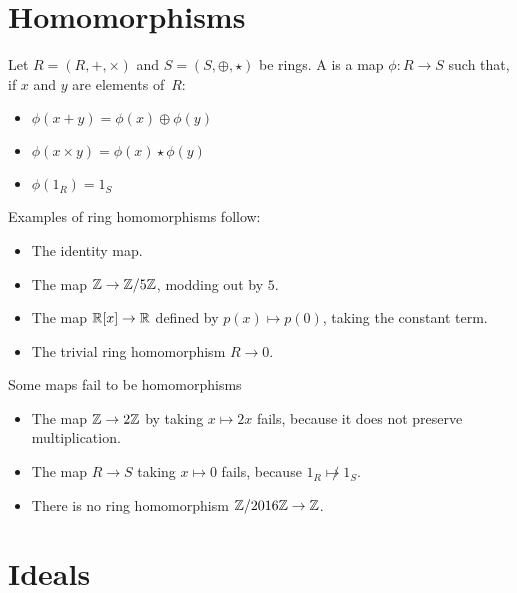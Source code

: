 \documentclass[11pt]{scrreport}
\begin{document}
\section{Homomorphisms}
\begin{definition}
    Let $R=(R,+,\times)$ and $S=(S,\oplus, \star)$ be rings. A  is a map $\phi: R\to S$ such that, if $x$ and $y$ are elements of $R$:
    \begin{itemize}
        \item $\phi(x+y) = \phi(x)\oplus\phi(y)$
        \item $\phi(x\times y) = \phi(x)\star\phi(y)$
        \item $\phi(1_R)=1_S$
    \end{itemize}
\end{definition}
\begin{example}
    Examples of ring homomorphisms follow:
    \begin{itemize}
        \item The identity map.
        \item The map $\mathbb Z\to \mathbb Z/5\mathbb Z$, modding out by $5$.
        \item The map $\mathbb R[x]\to \mathbb R$ defined by $p(x)\mapsto p(0)$, taking the constant term.
        \item The trivial ring homomorphism $R\to 0$.
    \end{itemize}
\end{example}
\begin{example}
    Some maps fail to be homomorphisms
    \begin{itemize}
        \item The map $\mathbb Z\to2\mathbb Z$ by taking $x\mapsto 2x$ fails, because it does not preserve multiplication.
        \item The map $R\to S$ taking $x\mapsto 0$ fails, because $1_R\not\mapsto 1_S$.
        \item There is no ring homomorphism $\mathbb Z/2016\mathbb Z\to \mathbb Z$.
    \end{itemize}
\end{example}
\section{Ideals}
\end{document}
